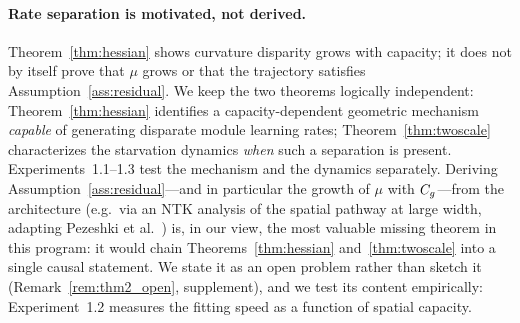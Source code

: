 \paragraph{Rate separation is motivated, not derived.}
Theorem~\ref{thm:hessian} shows curvature disparity grows with
capacity; it does not by itself prove that $\mu$ grows or that the
trajectory satisfies Assumption~\ref{ass:residual}. We keep the two
theorems logically independent: Theorem~\ref{thm:hessian} identifies a
capacity-dependent geometric mechanism \emph{capable} of generating
disparate module learning rates; Theorem~\ref{thm:twoscale}
characterizes the starvation dynamics \emph{when} such a separation is
present. Experiments~1.1--1.3 test the mechanism and the dynamics
separately. Deriving Assumption~\ref{ass:residual}---and in
particular the growth of $\mu$ with $C_g$---from the architecture
(e.g.\ via an NTK analysis of the spatial pathway at large width,
adapting Pezeshki et al.~\cite{pezeshki2021gradient}) is, in our
view, the most valuable missing theorem in this program: it would
chain Theorems~\ref{thm:hessian} and~\ref{thm:twoscale} into a
single causal statement. We state it as an open problem rather than
sketch it (Remark~\ref{rem:thm2_open}, supplement), and we test its
content empirically: Experiment~1.2 measures the fitting speed as a
function of spatial capacity.
